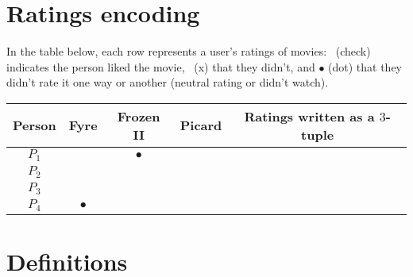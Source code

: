 \documentclass[12pt, oneside]{article}
\newcommand{\cmark}{\ding{51}}
\newcommand{\xmark}{\ding{55}}
\begin{document}
\begin{flushright}
\end{flushright} \section*{Ratings encoding}


In the table  below,  each row represents a user's ratings of movies: 
\cmark~(check) indicates the person liked the movie, \xmark~(x)
that they didn't, and $\bullet$ (dot) that they didn't rate it one way or another (neutral rating or didn't watch).

\begin{center}
\begin{tabular}{c|ccc||c}
Person & Fyre & Frozen II & Picard & Ratings written as a  $3$-tuple\\
\hline
$P_1$     & \xmark & $\bullet$ & \cmark & \phantom{$(-1, 0, 1)$} \\
$P_2$     & \cmark & \cmark & \xmark & \phantom{$(1, 1, -1)$} \\
$P_3$     & \cmark & \cmark & \cmark & \phantom{$(1, 1, 1)$} \\
$P_4$     & $\bullet$ & \xmark & \cmark &  \\
\end{tabular}
\end{center} \vfill
\section*{Definitions}
\end{document}
